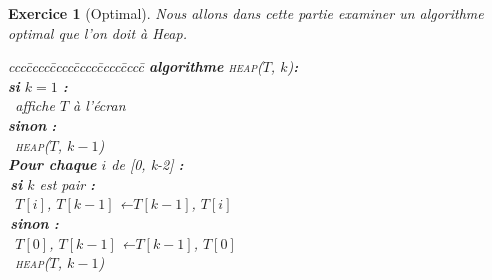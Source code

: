 \documentclass{article}
\theoremstyle{exostyle}
\newtheorem{exo}{Exercice}
\theoremstyle{partiestyle}
\theoremstyle{questionstyle}
\begin{document}
\begin{exo}[Optimal]
    Nous allons dans cette partie examiner un algorithme optimal que l'on doit à Heap.
        \begin{tabbing}
            ccc\=cccc\=cccc\=cccc\=cccc\=cccc\=\kill
            \textbf{algorithme} \textsc{heap}($T$, $k$){\bf :}\\
            \>\textbf{si} $k = 1$ {\bf :}\\
            \> \>\vline $\,$ affiche $T$ à l'écran  \\
            \>\textbf{sinon} {\bf :}\\
            \> \>\vline $\,$ \textsc{heap}($T$, $k-1$)\\
            \> \textbf{Pour chaque} $i$ de [0, k-2] {\bf :}\\
            \> \>\vline $\,$\textbf{si} $k$ est pair {\bf :}\\
            \> \>\vline \>\vline $\,$ $T[i]$, $T[k-1]$ ←$T[k-1]$, $T[i]$\\
            \> \>\vline $\,$\textbf{sinon} {\bf :}\\
            \> \>\vline \>\vline $\,$ $T[0]$, $T[k-1]$ ←$T[k-1]$, $T[0]$\\
            \> \>\vline $\,$ \textsc{heap}($T$, $k-1$)\\
        \end{tabbing}


\end{exo}
\end{document}
